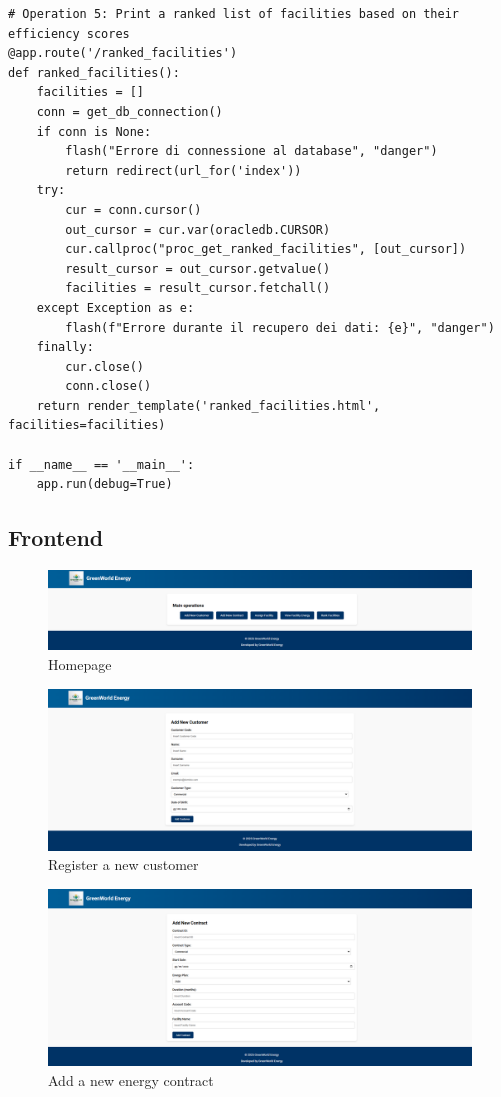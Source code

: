 \begin{lstlisting}
# Operation 5: Print a ranked list of facilities based on their efficiency scores
@app.route('/ranked_facilities')
def ranked_facilities():
    facilities = []
    conn = get_db_connection()
    if conn is None:
        flash("Errore di connessione al database", "danger")
        return redirect(url_for('index'))
    try:
        cur = conn.cursor()
        out_cursor = cur.var(oracledb.CURSOR)
        cur.callproc("proc_get_ranked_facilities", [out_cursor])
        result_cursor = out_cursor.getvalue()
        facilities = result_cursor.fetchall()
    except Exception as e:
        flash(f"Errore durante il recupero dei dati: {e}", "danger")
    finally:
        cur.close()
        conn.close()
    return render_template('ranked_facilities.html', facilities=facilities)

if __name__ == '__main__':
    app.run(debug=True)
\end{lstlisting}

\subsection{Frontend}

\begin{figure}[H]
    \centering
    \includegraphics[width=\textwidth]{images/homepage.png}
    \caption{Homepage}
\end{figure}

\begin{figure}[H]
    \centering
    \includegraphics[width=\textwidth]{images/Op1.png}
    \caption{Register a new customer}
\end{figure}


\begin{figure}[H]
    \centering
    \includegraphics[width=\textwidth]{images/Op2.png}
    \caption{Add a new energy contract}
\end{figure}


